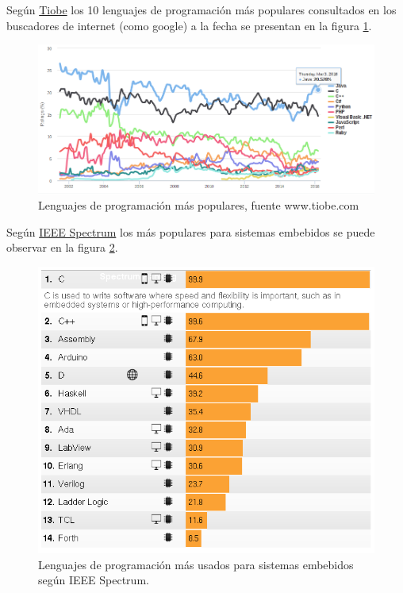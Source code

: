 \documentclass{article}
\begin{document}
Según \href{http://www.tiobe.com/tiobe_index?page=index}{Tiobe} los 10
lenguajes de programación más populares consultados en los buscadores
de internet (como google) a la fecha se presentan en la figura \ref{fig:lenguajes1}.

\begin{figure}[hptp]
    \centering
    \includegraphics[scale=0.4]{imag/lenguajes1.png}
    \caption{Lenguajes de programación más populares, fuente www.tiobe.com}
    \label{fig:lenguajes1}
\end{figure}
\smallskip

Según \href{spectrum.ieee.org}{IEEE Spectrum} los más populares para
sistemas embebidos se puede observar en la figura \ref{fig:lenguajes2}.

\begin{figure}[hptp]
    \centering
    \includegraphics[scale=0.4]{imag/lenguajes2.png}
    \caption{Lenguajes de programación más usados para sistemas
	embebidos según IEEE Spectrum.}
    \label{fig:lenguajes2}
\end{figure}
\smallskip
\end{document}
